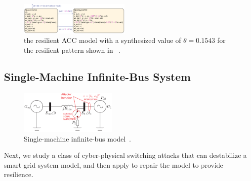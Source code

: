 \begin{figure}[t!]%
	\centering%
    \includegraphics[width=0.48\textwidth]{image/acc_model_pat3}%
	\caption{the resilient ACC model with a synthesized value of $\theta = 0.1543$ for the resilient pattern shown in ~.}%
\end{figure}%




\subsection{Single-Machine Infinite-Bus System}
%

\begin{figure}[t!]%
	\centering%
    \includegraphics[width=0.42\textwidth]{image/smib}%
	\caption{Single-machine infinite-bus model~\cite{farraj2014practical}.}%
\end{figure}%

Next, we study a class of cyber-physical switching attacks that can destabilize a smart grid system model, and then apply \toolreaffirm to repair the model to provide resilience. 

